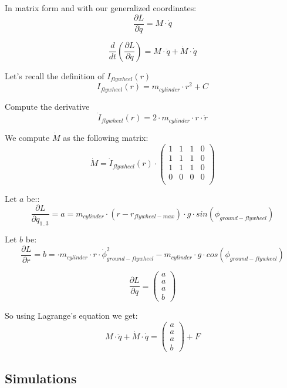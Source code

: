 In matrix form and with our generalized coordinates:
\begin{equation}
	\frac{\partial L}{\partial \dot{q}} =
	M \cdot \dot{q}
\end{equation}

\begin{equation}
	\frac{d}{dt}(\frac{\partial L}{\partial \dot{q}}) =
	 	M \cdot \ddot{q} + \dot{M} \cdot \dot{q} 	
\end{equation}

Let's recall the definition of $I_{flywheel}(r)$
\begin{equation}
	I_{flywheel}(r)= m_{cylinder} \cdot r^2 + C	
\end{equation}


Compute the derivative
\begin{equation}
	\dot{I}_{flywheel}(r)= 2 \cdot m_{cylinder} \cdot r \cdot \dot{r} 	
\end{equation}

We compute $\dot{M}$ as the following matrix:
\begin{equation}
	\dot{M}=
	\dot{I}_{flywheel}(r) \cdot
	\begin{pmatrix} 
		1&
		1&
		1&
		0\\
		1 &
		1 &
		1&
		0\\
		1 &
		1 &
		1 &
		0\\
		0 &
		0 &
		0 &
		0\\
		\end{pmatrix}
\end{equation}

Let $a$ be::
\begin{equation}
	\frac{\partial L}{\partial q_{1..3}} = a = m_{cylinder}\cdot (r-r_{flywheel-max}) \cdot g \cdot sin(\phi_{ground-flywheel})	
\end{equation}

Let $b$ be:
\begin{equation}
	\frac{\partial L}{\partial r} = b = \cdot m_{cylinder} \cdot r  \cdot \dot{\phi}_{ground-flywheel}^2  - m_{cylinder}\cdot g \cdot cos(\phi_{ground-flywheel})	
\end{equation}

\begin{equation}
	\frac{\partial L}{\partial q} = \begin{pmatrix}
	a \\ a \\ a \\ b
	\end{pmatrix}	
\end{equation}

So using Lagrange's equation we get:
\begin{equation}
	\boxed{
	M \cdot \ddot{q} + \dot{M} \cdot \dot{q}= 
	\begin{pmatrix}
		a \\ a \\ a \\ b
		\end{pmatrix}	
 	+ F
	}
\end{equation}

\subsection{Simulations}
